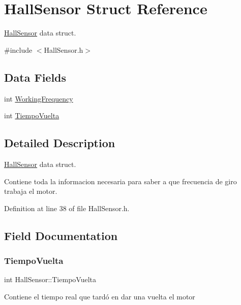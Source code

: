 \hypertarget{structHallSensor}{}\section{Hall\+Sensor Struct Reference}
\label{structHallSensor}


\mbox{\hyperlink{structHallSensor}{Hall\+Sensor}} data struct.  




{\ttfamily \#include $<$Hall\+Sensor.\+h$>$}

\subsection*{Data Fields}
\begin{DoxyCompactItemize}
\item 
int \mbox{\hyperlink{structHallSensor_aa9598178f2fba9eae32ca1f27fedb76d}{Working\+Frequency}}
\item 
int \mbox{\hyperlink{structHallSensor_aea93d53e0446642c786dd83f8f5f0cde}{Tiempo\+Vuelta}}
\end{DoxyCompactItemize}


\subsection{Detailed Description}
\mbox{\hyperlink{structHallSensor}{Hall\+Sensor}} data struct. 

Contiene toda la informacion necesaria para saber a que frecuencia de giro trabaja el motor. 

Definition at line 38 of file Hall\+Sensor.\+h.



\subsection{Field Documentation}
\mbox{\label{structHallSensor_aea93d53e0446642c786dd83f8f5f0cde}} 
\subsubsection{\texorpdfstring{Tiempo\+Vuelta}{TiempoVuelta}}
{\footnotesize\ttfamily int Hall\+Sensor\+::\+Tiempo\+Vuelta}

Contiene el tiempo real que tardó en dar una vuelta el motor 


